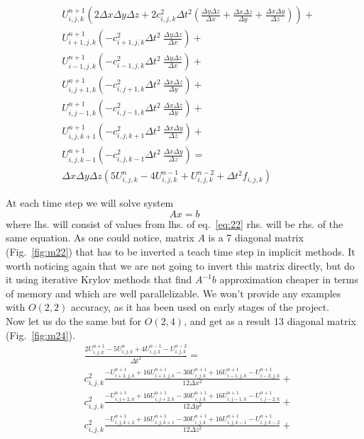 \documentclass[12pt,a4paper]{report}
\begin{document}
\begin{equation}
\begin{aligned}
& U^{n+1}_{i,j,k} \left(2 \Delta x \Delta y \Delta z + 2 c^2_{i,j,k} \Delta t^2 \left( \frac{\Delta y \Delta z}{\Delta x} + \frac{\Delta x \Delta z}{\Delta y}+ \frac{\Delta x \Delta y}{\Delta z}\right)\right) + \\
& U^{n+1}_{i+1,j,k}  \left( -c^2_{i+1,j,k} \Delta t^2\ \frac{\Delta y \Delta z}{\Delta x}\right) + \\
& U^{n+1}_{i-1,j,k}  \left( -c^2_{i-1,j,k} \Delta t^2\ \frac{\Delta y \Delta z}{\Delta x}\right) + \\
& U^{n+1}_{i,j+1,k}  \left( -c^2_{i,j+1,k} \Delta t^2\ \frac{\Delta x \Delta z}{\Delta y}\right) + \\
& U^{n+1}_{i,j-1,k}  \left( -c^2_{i,j-1,k} \Delta t^2\ \frac{\Delta x \Delta z}{\Delta y}\right) + \\
& U^{n+1}_{i,j,k+1}  \left( -c^2_{i,j,k+1} \Delta t^2\ \frac{\Delta x \Delta y}{\Delta z}\right) + \\
& U^{n+1}_{i,j,k-1}  \left( -c^2_{i,j,k-1} \Delta t^2\ \frac{\Delta x \Delta y}{\Delta z}\right) = \\
& \Delta x \Delta y \Delta z \left( 5 U^{n}_{i,j,k} - 4 U^{n-1}_{i,j,k} + U^{n-2}_{i,j,k} + \Delta t^2 f_{i,j,k} \right)
\end{aligned}
\label{eq:22}
\end{equation}

At each time step we will solve system
\begin{equation}
Ax=b
\end{equation}
where lhs. will consist of values from lhs. of eq.~\ref{eq:22} rhs. will be rhs. of the same equation. As one could notice, matrix $A$ is a 7 diagonal matrix (Fig.~\ref{fig:m22}) that has to be inverted a teach time step in implicit methods. It worth noticing again that we are not going to invert this matrix directly, but do it using iterative Krylov methods that find $A^{-1} b$ approximation cheaper in terms of memory and which are well parallelizable. We won't provide any examples with $O(2,2)$ accuracy, as it has been used on early stages of the project.\\

Now let us do the same but for $O\left(2,4\right)$, and get as a result 13 diagonal matrix (Fig.~\ref{fig:m24}).
\begin{equation}
\begin{aligned}
&\frac{2 U^{n+1}_{i,j,k} - 5 U^{n}_{i,j,k} + 4 U^{n-1}_{i,j,k} - U^{n-2}_{i,j,k}}{\Delta t^2} = \\
& c^2_{i,j,k} \frac{-U^{n+1}_{i+2,j,k} + 16 U^{n+1}_{i+1,j,k} - 30 U^{n+1}_{i,j,k} + 16 U^{n+1}_{i-1,j,k} - U^{n+1}_{i-2,j,k}}{12\Delta x^2} +\\
& c^2_{i,j,k} \frac{-U^{n+1}_{i,j+2,k} + 16 U^{n+1}_{i,j+2,k} - 30 U^{n+1}_{i,j,k} + 16 U^{n+1}_{i,j-1,k} - U^{n+1}_{i,j-2,k}}{12\Delta y^2} +\\
& c^2_{i,j,k} \frac{-U^{n+1}_{i,j,k+2} + 16 U^{n+1}_{i,j,k+1} - 30 U^{n+1}_{i,j,k} + 16 U^{n+1}_{i,j,k-1} - U^{n+1}_{i,j,k-2}}{12\Delta z^2} +\\
\end{aligned}
\end{equation}
\end{document}
